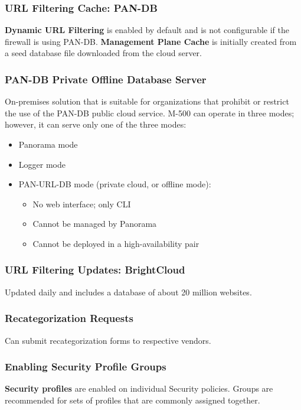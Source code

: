 \subsubsection{URL Filtering Cache: PAN-DB}
\textbf{Dynamic URL Filtering} is enabled by default and is not configurable if the firewall is using PAN-DB.
\textbf{Management Plane Cache} is initially created from a seed database file downloaded from the cloud server.

\subsubsection{PAN-DB Private Offline Database Server}
On-premises solution that is suitable for organizations that prohibit or restrict the use of the PAN-DB public cloud service.
M-500 can operate in three modes; however, it can serve only one of the three modes:
    \begin{itemize}
        \item Panorama mode
        \item Logger mode
        \item PAN-URL-DB mode (private cloud, or offline mode):
            \begin{itemize}
                \item No web interface; only CLI
                \item Cannot be managed by Panorama
                \item Cannot be deployed in a high-availability pair
            \end{itemize}
    \end{itemize}
\subsubsection{URL Filtering Updates:  BrightCloud}
Updated daily and includes a database of about 20 million websites.

\subsubsection{Recategorization Requests}
Can submit recategorization forms to respective vendors.

\subsubsection{Enabling Security Profile Groups}
\textbf{Security profiles} are enabled on individual Security policies. Groups are recommended for sets of profiles that are commonly assigned together.

